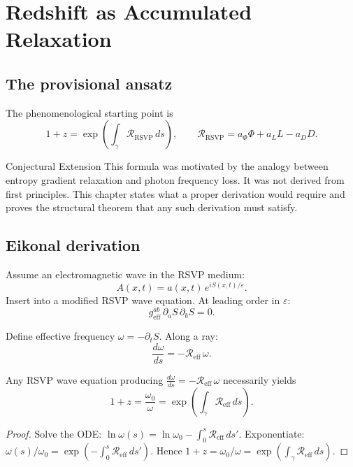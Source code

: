 
\chapter{Redshift as Accumulated Relaxation}
\label{ch:redshift}

\section{The provisional ansatz}

The phenomenological starting point is
\[
  1+z = \exp\!\left(\int_\gamma \mathcal{R}_{\mathrm{RSVP}}\,ds\right),
  \qquad
  \mathcal{R}_{\mathrm{RSVP}}
  = a_\Phi\Phi + a_L L - a_D D.
\]

\begin{StatusBox}{Conjectural Extension}
  This formula was motivated by the analogy between entropy
  gradient relaxation and photon frequency loss.
  It was not derived from first principles.
  This chapter states what a proper derivation would require
  and proves the structural theorem that any such derivation
  must satisfy.
\end{StatusBox}

\section{Eikonal derivation}

Assume an electromagnetic wave in the RSVP medium:
\[
  A(x,t) = a(x,t)\,e^{iS(x,t)/\varepsilon}.
\]
Insert into a modified RSVP wave equation.
At leading order in $\varepsilon$:
\[
  g_{\mathrm{eff}}^{ab}\,\partial_a S\,\partial_b S = 0.
\]

Define effective frequency $\omega = -\partial_t S$.
Along a ray:
\[
  \frac{d\omega}{ds} = -\mathcal{R}_{\mathrm{eff}}\,\omega.
\]

\begin{theorem}
  \label{thm:redshift-structure}
  \statusproven{}
  Any RSVP wave equation producing
  $\frac{d\omega}{ds} = -\mathcal{R}_{\mathrm{eff}}\,\omega$
  necessarily yields
  \[
    1+z = \frac{\omega_0}{\omega}
    = \exp\!\left(\int_\gamma \mathcal{R}_{\mathrm{eff}}\,ds\right).
  \]
\end{theorem}

\begin{proof}
  Solve the ODE:
  $\ln\omega(s) = \ln\omega_0 - \int_0^s \mathcal{R}_{\mathrm{eff}}\,ds'$.
  Exponentiate:
  $\omega(s)/\omega_0 = \exp(-\int_0^s \mathcal{R}_{\mathrm{eff}}\,ds')$.
  Hence $1+z = \omega_0/\omega = \exp(\int_\gamma\mathcal{R}_{\mathrm{eff}}\,ds)$.
\end{proof}


